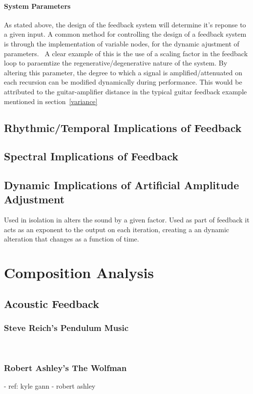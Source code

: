 \documentclass[titlepage]{scrartcl}
\begin{document}
    \paragraph{System Parameters}
    As stated above, the design of the feedback system will determine it's
    reponse to a given input. A common method for controlling the design of a
    feedback system is through the implementation of variable nodes, for the
    dynamic ajustment of parameters.~\parencite[p.19-27]{weisert2010ioi}
    A clear example of this is the use of a scaling factor in the feedback loop
    to paraemtize the regenerative/degenerative nature of the system. By
    altering this parameter, the degree to which a signal is
    amplified/attenuated on each recursion can be modified dynamically during
    performance. This would be attributed to the guitar-amplifier distance in
    the typical guitar feedback example mentioned in section~\ref{variance}

    \subsection{Rhythmic/Temporal Implications of Feedback}
    \subsection{Spectral Implications of Feedback}
    \subsection{Dynamic Implications of Artificial Amplitude Adjustment}
    Used in isolation in alters the sound by a given factor. 
    Used as part of feedback it acts as an exponent to the output on each
    iteration, creating a an dynamic alteration that changes as a function of
    time.

    \section{Composition Analysis}
    \subsection{Acoustic Feedback}
    \subsubsection{Steve Reich's Pendulum Music}\label{pendulum}
    ~\parencite[p.31]{reich2002wom}
    \subsubsection{Robert Ashley's The Wolfman}\label{wolfman}
    - ref: kyle gann - robert ashley
    ~\citeyearpar{ashley2003w}
\end{document}
